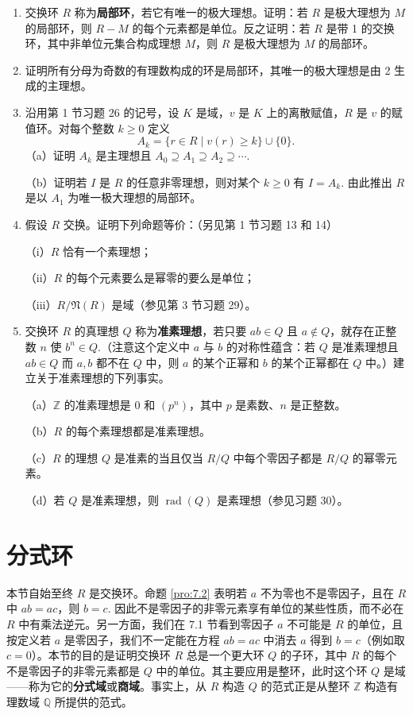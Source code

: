 \begin{enumerate}
\item 交换环 \(R\) 称为\textbf{局部环}，若它有唯一的极大理想。证明：若 \(R\) 是极大理想为 \(M\) 的局部环，则 \(R - M\) 的每个元素都是单位。反之证明：若 \(R\) 是带 1 的交换环，其中非单位元集合构成理想 \(M\)，则 \(R\) 是极大理想为 \(M\) 的局部环。

\item 证明所有分母为奇数的有理数构成的环是局部环，其唯一的极大理想是由 2 生成的主理想。

\item 沿用第 1 节习题 26 的记号，设 \(K\) 是域，\(v\) 是 \(K\) 上的离散赋值，\(R\) 是 \(v\) 的赋值环。对每个整数 \(k \geq 0\) 定义
\[
A_k = \{r \in R \mid v(r) \geq k\} \cup \{0\}.
\]
（a）证明 \(A_k\) 是主理想且 \(A_0 \supseteq A_1 \supseteq A_2 \supseteq \cdots\).

（b）证明若 \(I\) 是 \(R\) 的任意非零理想，则对某个 \(k \geq 0\) 有 \(I = A_k\). 由此推出 \(R\) 是以 \(A_1\) 为唯一极大理想的局部环。

\item 假设 \(R\) 交换。证明下列命题等价：（另见第 1 节习题 13 和 14）

（i）\(R\) 恰有一个素理想；

（ii）\(R\) 的每个元素要么是幂零的要么是单位；

（iii）\(R/\mathfrak{N}(R)\) 是域（参见第 3 节习题 29）。

\item 交换环 \(R\) 的真理想 \(Q\) 称为\textbf{准素理想}，若只要 \(ab \in Q\) 且 \(a \notin Q\)，就存在正整数 \(n\) 使 \(b^n \in Q\).（注意这个定义中 \(a\) 与 \(b\) 的对称性蕴含：若 \(Q\) 是准素理想且 \(ab \in Q\) 而 \(a, b\) 都不在 \(Q\) 中，则 \(a\) 的某个正幂和 \(b\) 的某个正幂都在 \(Q\) 中。）建立关于准素理想的下列事实。

（a）\(\mathbb{Z}\) 的准素理想是 0 和 \((p^n)\)，其中 \(p\) 是素数、\(n\) 是正整数。

（b）\(R\) 的每个素理想都是准素理想。

（c）\(R\) 的理想 \(Q\) 是准素的当且仅当 \(R/Q\) 中每个零因子都是 \(R/Q\) 的幂零元素。

（d）若 \(Q\) 是准素理想，则 \(\operatorname{rad}(Q)\) 是素理想（参见习题 30）。
\end{enumerate}

\section{分式环}

本节自始至终 \(R\) 是交换环。命题 \ref{pro:7.2} 表明若 \(a\) 不为零也不是零因子，且在 \(R\) 中 \(ab = ac\)，则 \(b = c\). 因此不是零因子的非零元素享有单位的某些性质，而不必在 \(R\) 中有乘法逆元。另一方面，我们在 7.1 节看到零因子 \(a\) 不可能是 \(R\) 的单位，且按定义若 \(a\) 是零因子，我们不一定能在方程 \(ab = ac\) 中消去 \(a\) 得到 \(b = c\)（例如取 \(c = 0\)）。本节的目的是证明交换环 \(R\) 总是一个更大环 \(Q\) 的子环，其中 \(R\) 的每个不是零因子的非零元素都是 \(Q\) 中的单位。其主要应用是整环，此时这个环 \(Q\) 是域——称为它的\textbf{分式域}或\textbf{商域}。事实上，从 \(R\) 构造 \(Q\) 的范式正是从整环 \(\mathbb{Z}\) 构造有理数域 \(\mathbb{Q}\) 所提供的范式。

